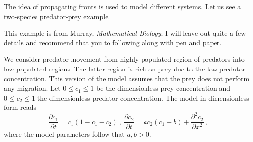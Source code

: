 The idea of propagating fronts is used to model different systems. Let us see a two-species 
predator-prey example. 
\begin{example}\label{example:multifront}
	This example is from Murray, \textit{Mathematical Biology}; I will leave out 
	quite a few details and recommend that you to following along with pen and paper. 

	We consider predator movement from highly
	populated region of predators into low populated regions. The latter region is
	rich on prey due to the low predator concentration. This version of the model
	assumes that the prey does not perform any migration. Let
	$0 \leq c_1 \leq 1$ be the dimensionless prey concentration and
	$0 \leq c_2 \leq 1$ the dimensionless predator concentration. The model in 
	dimensionless form reads
	\begin{equation}
		\label{eq:pp0}
		\frac{\partial c_1}{\partial t} = c_1(1-c_1-c_2) \ ,
		\ \frac{\partial c_2}{\partial t} =
		ac_2(c_1-b) + \frac{\partial^2 c_2}{\partial x^2} \, ,
	\end{equation}
	where the model parameters follow that $a,b > 0$. 


\end{example}
